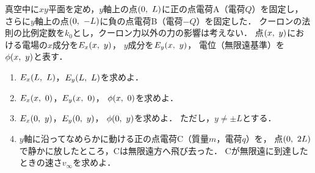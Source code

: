 \documentclass[../../../all/physics-standard_questions_all.tex]{subfiles}
\begin{document}
真空中に$xy$平面を定め，$y$軸上の点$(0, \hspace{1.2mm} L)$に正の点電荷A（電荷$Q$）を固定し，
さらに$y$軸上の点$(0, \hspace{1.2mm} -L)$に負の点電荷B（電荷$-Q$）を固定した．
クーロンの法則の比例定数を$k_0$とし，クーロン力以外の力の影響は考えない．
点$(x, \hspace{1.2mm} y)$における電場の$x$成分を$E_x(x, \hspace{1.2mm} y)$，
$y$成分を$E_y(x, \hspace{1.2mm} y)$，
電位（無限遠基準）を$\phi(x, \hspace{1.2mm} y)$と表す．

\begin{enumerate}

    \item $E_x(L, \hspace{1.2mm} L)$，$E_y(L, \hspace{1.2mm} L)$を求めよ．

    \item $E_x(x, \hspace{1.2mm} 0)$，$E_y(x, \hspace{1.2mm} 0)$，
    $\phi(x, \hspace{1.2mm} 0)$を求めよ．

    \item $E_x(0, \hspace{1.2mm} y)$，$E_y(0, \hspace{1.2mm} y)$，
    $\phi(0, \hspace{1.2mm} y)$を求めよ．
    ただし，$y \neq \pm L$とする．

    \item $y$軸に沿ってなめらかに動ける正の点電荷C（質量$m$，電荷$q$）を，
    点$(0, \hspace{1.2mm} 2L)$で静かに放したところ，Cは無限遠方へ飛び去った．
    Cが無限遠に到達したときの速さ$v_\infty$を求めよ．

\end{enumerate}
\end{document}

